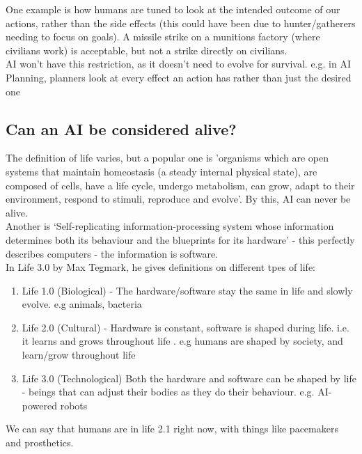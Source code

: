 One example is how humans are tuned to look at the intended outcome of our actions, rather than the side effects (this could have been due to hunter/gatherers needing to focus on goals). A missile strike on a munitions factory (where civilians work) is acceptable, but not a strike directly on civilians. \\

AI won't have this restriction, as it doesn't need to evolve for survival. e.g. in AI Planning, planners look at every effect an action has rather than just the desired one

\subsection{Can an AI be considered alive?}
The definition of life varies, but a popular one is 'organisms which are open systems
that maintain homeostasis (a steady internal physical state), are composed of cells, have a life cycle, undergo
metabolism, can grow, adapt to their environment, respond to stimuli, reproduce
and evolve'. By this, AI can never be alive. \\

Another is ‘Self-replicating information-processing system whose information 
determines both its behaviour and the blueprints for its hardware’ - this perfectly describes computers - the information is software. \\

In Life 3.0 by Max Tegmark, he gives definitions on different tpes of life:

\begin{enumerate}
    \item Life 1.0 (Biological) - The hardware/software stay the same in life and slowly evolve. e.g animals, bacteria
    \item Life 2.0 (Cultural) - Hardware is constant, software is shaped during life. i.e. it learns and grows throughout life . e.g humans are shaped by society, and learn/grow throughout life
    \item Life 3.0 (Technological) Both the hardware and software can be shaped by life - beings that can adjust their bodies as they do their behaviour. e.g. AI-powered robots
\end{enumerate}
We can say that humans are in life 2.1 right now, with things like pacemakers and prosthetics. 